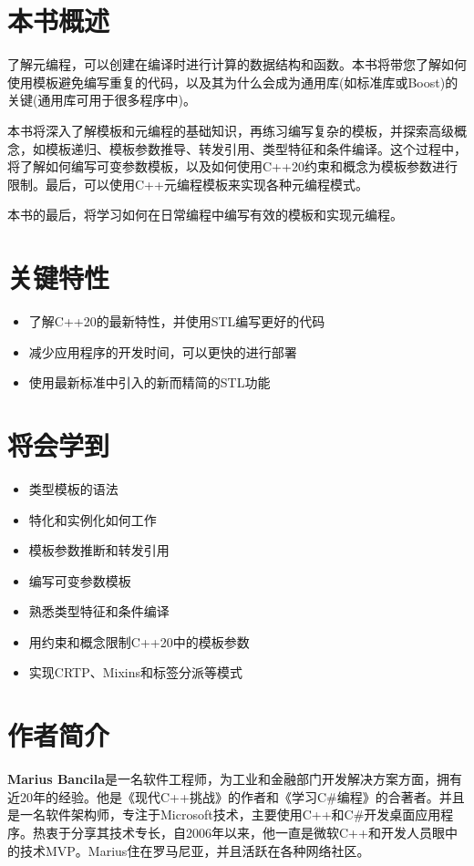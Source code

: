 \section*{本书概述}

了解元编程，可以创建在编译时进行计算的数据结构和函数。本书将带您了解如何使用模板避免编写重复的代码，以及其为什么会成为通用库(如标准库或Boost)的关键(通用库可用于很多程序中)。

本书将深入了解模板和元编程的基础知识，再练习编写复杂的模板，并探索高级概念，如模板递归、模板参数推导、转发引用、类型特征和条件编译。这个过程中，将了解如何编写可变参数模板，以及如何使用C++20约束和概念为模板参数进行限制。最后，可以使用C++元编程模板来实现各种元编程模式。

本书的最后，将学习如何在日常编程中编写有效的模板和实现元编程。

\section*{关键特性}
\begin{itemize}
  \item 了解C++20的最新特性，并使用STL编写更好的代码
  \item 减少应用程序的开发时间，可以更快的进行部署
  \item 使用最新标准中引入的新而精简的STL功能
\end{itemize}

\section*{将会学到}
\begin{itemize}
  \item 类型模板的语法
  \item 特化和实例化如何工作
  \item 模板参数推断和转发引用
  \item 编写可变参数模板
  \item 熟悉类型特征和条件编译
  \item 用约束和概念限制C++20中的模板参数
  \item 实现CRTP、Mixins和标签分派等模式
\end{itemize}

\section*{作者简介}

\textbf{Marius Bancila}是一名软件工程师，为工业和金融部门开发解决方案方面，拥有近20年的经验。他是《现代C++挑战》的作者和《学习C\#编程》的合著者。并且是一名软件架构师，专注于Microsoft技术，主要使用C++和C\#开发桌面应用程序。热衷于分享其技术专长，自2006年以来，他一直是微软C++和开发人员眼中的技术MVP。Marius住在罗马尼亚，并且活跃在各种网络社区。

